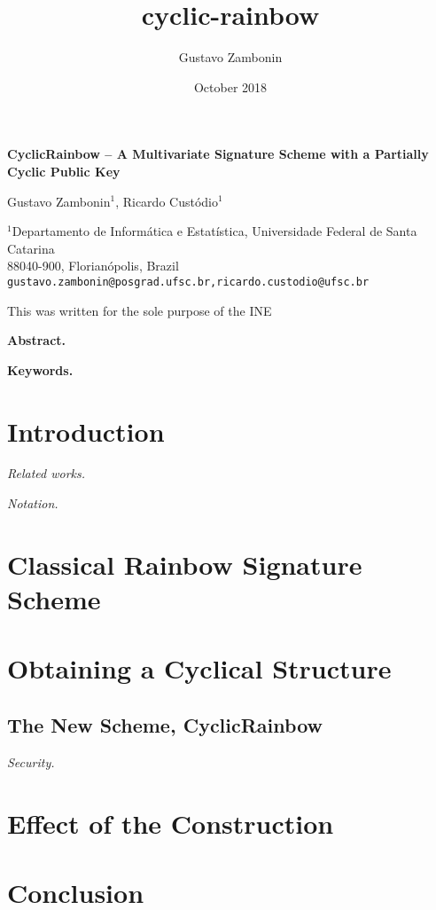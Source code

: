 \documentclass[a4paper, 14pt]{extarticle}
\title{cyclic-rainbow}
\author{Gustavo Zambonin}
\date{October 2018}
\begin{document}
\begin{center}
    {\Large\bf CyclicRainbow -- A Multivariate Signature 
    Scheme with a Partially Cyclic Public Key} \vspace{.75cm}
    
    Gustavo Zambonin$^{1}$, Ricardo Custódio$^{1}$
    
    $^{1}$Departamento de Informática e Estatística, Universidade Federal de Santa Catarina \\
    88040-900, Florianópolis, Brazil \\
    \texttt{gustavo.zambonin@posgrad.ufsc.br,ricardo.custodio@ufsc.br}
    
    This was written for the sole purpose of the INE
    \vspace{.75cm}
    
    \textbf{Abstract.} 
    
    \textbf{Keywords.}
\end{center}

\section{Introduction}

\emph{Related works.}

\emph{Notation.}

\section{Classical Rainbow Signature Scheme}

\section{Obtaining a Cyclical Structure}

\subsection{The New Scheme, CyclicRainbow}

\emph{Security.}

\section{Effect of the Construction}

\section{Conclusion}
\end{document}
